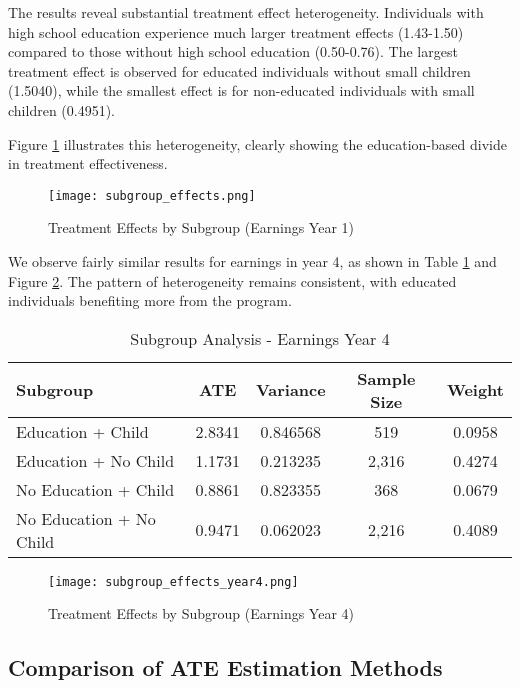 \documentclass[12pt]{article}
\begin{document}
The results reveal substantial treatment effect heterogeneity. Individuals with high school education experience much larger treatment effects (1.43-1.50) compared to those without high school education (0.50-0.76). The largest treatment effect is observed for educated individuals without small children (1.5040), while the smallest effect is for non-educated individuals with small children (0.4951).

Figure \ref{fig:subgroup_effects} illustrates this heterogeneity, clearly showing the education-based divide in treatment effectiveness.

\begin{figure}[h]
\centering
\texttt{[image: subgroup\_effects.png]}
\caption{Treatment Effects by Subgroup (Earnings Year 1)}
\label{fig:subgroup_effects}
\end{figure}

We observe fairly similar results for earnings in year 4, as shown in Table \ref{tab:subgroup_results_year4} and Figure \ref{fig:subgroup_effects_year4}. The pattern of heterogeneity remains consistent, with educated individuals benefiting more from the program.

\begin{table}[h]
\centering
\caption{Subgroup Analysis - Earnings Year 4}
\label{tab:subgroup_results_year4}
\begin{tabular}{lcccc}
\hline
\textbf{Subgroup} & \textbf{ATE} & \textbf{Variance} & \textbf{Sample Size} & \textbf{Weight} \\
\hline
Education + Child & 2.8341 & 0.846568 & 519 & 0.0958 \\
Education + No Child & 1.1731 & 0.213235 & 2,316 & 0.4274 \\
No Education + Child & 0.8861 & 0.823355 & 368 & 0.0679 \\
No Education + No Child & 0.9471 & 0.062023 & 2,216 & 0.4089 \\
\hline
\end{tabular}
\end{table}

\begin{figure}[h]
\centering
\texttt{[image: subgroup\_effects\_year4.png]}
\caption{Treatment Effects by Subgroup (Earnings Year 4)}
\label{fig:subgroup_effects_year4}
\end{figure}

\subsection{Comparison of ATE Estimation Methods}
\end{document}
